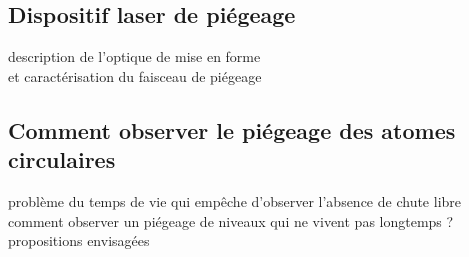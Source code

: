 	\subsection{Dispositif laser de piégeage}
		\noindent description de l'optique de mise en forme \\
		et caractérisation du faisceau de piégeage
	\subsection{Comment observer le piégeage des atomes circulaires}
		\noindent problème du temps de vie qui empêche d'observer l'absence de chute libre \\
		\noindent comment observer un piégeage de niveaux qui ne vivent pas longtemps ? propositions envisagées
